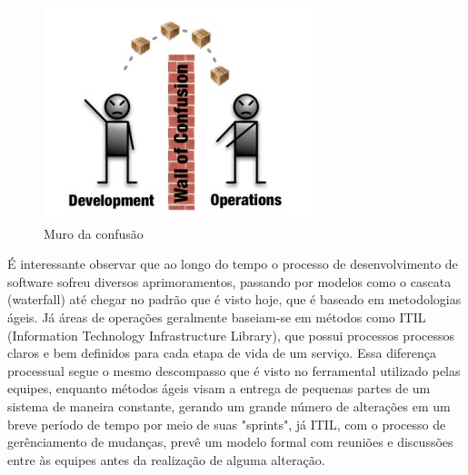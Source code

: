 \documentclass[twoside,english,brazilian]{UNISINOSartigo}
\begin{document}
\begin{figure}[h]
    \centering
    \includegraphics[scale=.9]{imagens/wallOfConfusion.jpg}
    \caption{Muro da confusão}
    \label{fig:Muro da confusão}
\end{figure}
É interessante observar que ao longo do tempo o processo de desenvolvimento de software sofreu diversos aprimoramentos, passando por modelos como o cascata (waterfall) até chegar no padrão que é visto hoje, que é baseado em metodologias ágeis. Já áreas de operações geralmente baseiam-se em métodos como ITIL (Information Technology Infrastructure Library), que possui processos processos claros e bem definidos para cada etapa de vida de um serviço. Essa diferença processual segue o mesmo descompasso que é visto no ferramental utilizado pelas equipes, enquanto métodos ágeis visam a entrega de pequenas partes de um sistema de maneira constante, gerando um grande número de alterações em um breve período de tempo por meio de suas "sprints", já ITIL, com o processo de gerênciamento de mudanças, prevê um modelo formal com reuniões e discussões entre às equipes antes da realização de alguma alteração. 
% 
% 
\end{document}
